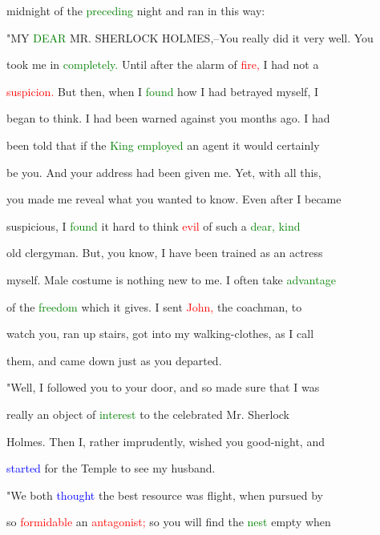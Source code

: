  midnight of the \textcolor{green}{preceding} night and ran in this way:



 "MY \textcolor{green}{DEAR} MR. SHERLOCK HOLMES,--You really did it very well. You

 took me in \textcolor{green}{completely.} Until after the \textcolor{BurntOrange}{alarm} of \textcolor{red}{fire,} I had not a

 \textcolor{red}{suspicion.} But then, when I \textcolor{green}{found} how I had betrayed myself, I

 began to think. I had been \textcolor{BurntOrange}{warned} against you months ago. I had

 been told that if the \textcolor{green}{King} \textcolor{green}{employed} an agent it would certainly

 be you. And your address had been given me. Yet, with all this,

 you made me reveal what you wanted to know. Even after I became

 \textcolor{BurntOrange}{suspicious,} I \textcolor{green}{found} it hard to think \textcolor{red}{evil} of such a \textcolor{green}{dear,} \textcolor{green}{kind}

 old clergyman. But, you know, I have been trained as an actress

 myself. Male costume is nothing new to me. I often take \textcolor{green}{advantage}

 of the \textcolor{green}{freedom} which it gives. I sent \textcolor{red}{John,} the coachman, to

 \textcolor{BurntOrange}{watch} you, ran up stairs, got into my walking-clothes, as I call

 them, and came down just as you \textcolor{BurntOrange}{departed.}



 "Well, I followed you to your door, and so made sure that I was

 really an object of \textcolor{green}{interest} to the celebrated Mr. Sherlock

 Holmes. Then I, rather imprudently, wished you good-night, and

 \textcolor{blue}{started} for the Temple to see my husband.



 "We both \textcolor{blue}{thought} the best resource was flight, when pursued by

 so \textcolor{red}{formidable} an \textcolor{red}{antagonist;} so you will find the \textcolor{green}{nest} empty when

